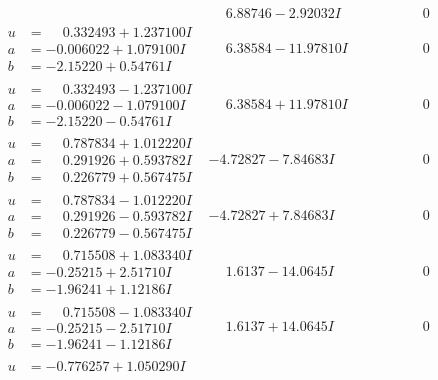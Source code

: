 \documentclass[1p]{elsarticle_modified}
\theoremstyle{definition}
\begin{document}
$$\begin{array}{c|c|c}
 & \phantom{-}6.88746 - 2.92032 I & \phantom{-0.000000 } 0 \\ \hline\begin{aligned}
u &= \phantom{-}0.332493 + 1.237100 I \\
a &= -0.006022 + 1.079100 I \\
b &= -2.15220 + 0.54761 I\end{aligned}
 & \phantom{-}6.38584 - 11.97810 I & \phantom{-0.000000 } 0 \\ \hline\begin{aligned}
u &= \phantom{-}0.332493 - 1.237100 I \\
a &= -0.006022 - 1.079100 I \\
b &= -2.15220 - 0.54761 I\end{aligned}
 & \phantom{-}6.38584 + 11.97810 I & \phantom{-0.000000 } 0 \\ \hline\begin{aligned}
u &= \phantom{-}0.787834 + 1.012220 I \\
a &= \phantom{-}0.291926 + 0.593782 I \\
b &= \phantom{-}0.226779 + 0.567475 I\end{aligned}
 & -4.72827 - 7.84683 I & \phantom{-0.000000 } 0 \\ \hline\begin{aligned}
u &= \phantom{-}0.787834 - 1.012220 I \\
a &= \phantom{-}0.291926 - 0.593782 I \\
b &= \phantom{-}0.226779 - 0.567475 I\end{aligned}
 & -4.72827 + 7.84683 I & \phantom{-0.000000 } 0 \\ \hline\begin{aligned}
u &= \phantom{-}0.715508 + 1.083340 I \\
a &= -0.25215 + 2.51710 I \\
b &= -1.96241 + 1.12186 I\end{aligned}
 & \phantom{-}1.6137 - 14.0645 I & \phantom{-0.000000 } 0 \\ \hline\begin{aligned}
u &= \phantom{-}0.715508 - 1.083340 I \\
a &= -0.25215 - 2.51710 I \\
b &= -1.96241 - 1.12186 I\end{aligned}
 & \phantom{-}1.6137 + 14.0645 I & \phantom{-0.000000 } 0 \\ \hline\begin{aligned}
u &= -0.776257 + 1.050290 I \\

\end{aligned}
\end{array}$$
\end{document}
